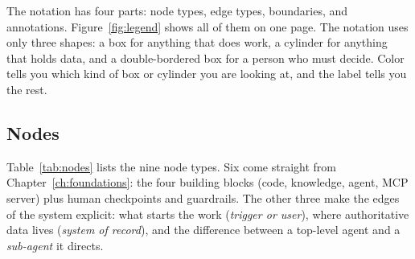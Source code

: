 The notation has four parts: node types, edge types, boundaries, and annotations. Figure~\ref{fig:legend} shows all of them on one page. The notation uses only three shapes: a box for anything that does work, a cylinder for anything that holds data, and a double-bordered box for a person who must decide. Color tells you which kind of box or cylinder you are looking at, and the label tells you the rest.

\subsection{Nodes}

Table~\ref{tab:nodes} lists the nine node types. Six come straight from Chapter~\ref{ch:foundations}: the four building blocks (code, knowledge, agent, MCP server) plus human checkpoints and guardrails. The other three make the edges of the system explicit: what starts the work (\emph{trigger or user}), where authoritative data lives (\emph{system of record}), and the difference between a top-level agent and a \emph{sub-agent} it directs.

